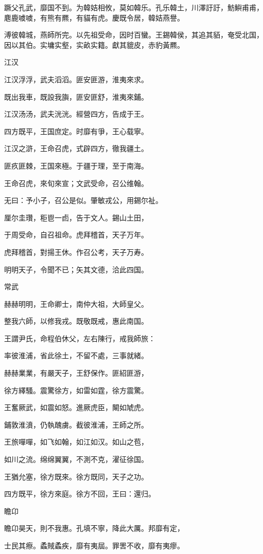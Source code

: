 蹶父孔武，靡国不到。为韓姞相攸，莫如韓乐。孔乐韓土，川澤訏訏，魴鱮甫甫，麀鹿噳噳，有熊有羆，有貓有虎。慶既令居，韓姞燕譽。

溥彼韓城，燕師所完。以先祖受命，因时百蠻。王錫韓侯，其追其貊，奄受北国，因以其伯。实墉实壑，实畝实籍。獻其貔皮，赤豹黃羆。

江汉

江汉浮浮，武夫滔滔。匪安匪游，淮夷來求。

既出我車，既設我旟，匪安匪舒，淮夷來鋪。

江汉汤汤，武夫洸洸。經營四方，告成于王。

四方既平，王国庶定。时靡有爭，王心载寧。

江汉之滸，王命召虎，式辟四方，徹我疆土。

匪疚匪棘，王国來極。于疆于理，至于南海。

王命召虎，來旬來宣；文武受命，召公维翰。

无曰：予小子，召公是似。肇敏戎公，用錫尔祉。

厘尔圭瓚，秬鬯一卣，告于文人。錫山土田，

于周受命，自召祖命。虎拜稽首，天子万年。

虎拜稽首，對揚王休。作召公考，天子万寿。

明明天子，令聞不已；矢其文德，洽此四国。

常武

赫赫明明，王命卿士，南仲大祖，大師皇父。

整我六師，以修我戎。既敬既戒，惠此南国。

王謂尹氏，命程伯休父，左右陳行，戒我師旅：

率彼淮浦，省此徐土，不留不處，三事就緒。

赫赫業業，有嚴天子，王舒保作。匪紹匪游，

徐方繹騷。震驚徐方，如雷如霆，徐方震驚。

王奮厥武，如震如怒。進厥虎臣，闞如虓虎。

鋪敦淮濆，仍執醜虜。截彼淮浦，王師之所。

王旅嘽嘽，如飞如翰，如江如汉。如山之苞，

如川之流。绵绵翼翼，不測不克，濯征徐国。

王猶允塞，徐方既來。徐方既同，天子之功。

四方既平，徐方來庭。徐方不回，王曰：還归。

瞻卬

瞻卬昊天，則不我惠。孔填不寧，降此大厲。邦靡有定，

士民其瘵。蟊賊蟊疾，靡有夷屆。罪罟不收，靡有夷瘳。

